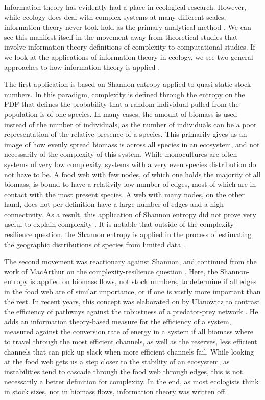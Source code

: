 \documentclass[../main.tex]{subfiles}
\begin{document}
Information theory has evidently had a place in ecological research.
However, while ecology does deal with complex systems at many different scales, information theory never took hold as the primary analytical method \cite{ulanowicz2001information}. %
We can see this manifest itself in the movement away from theoretical studies that involve information theory definitions of complexity to computational studies.
If we look at the applications of information theory in ecology, we see two general approaches to how information theory is applied \cite{ulanowicz2001information}.

The first application is based on Shannon entropy applied to quasi-static stock numbers.
In this paradigm, complexity is defined through the entropy on the PDF that defines the probability that a random individual pulled from the population is of one species.
In many cases, the amount of biomass is used instead of the number of individuals, as the number of individuals can be a poor representation of the relative presence of a species.
This primarily gives us an image of how evenly spread biomass is across all species in an ecosystem, and not necessarily of the complexity of this system.
While monocultures are often systems of very low complexity, systems with a very even species distribution do not have to be.
A food web with few nodes, of which one holds the majority of all biomass, is bound to have a relativily low number of edges, most of which are in contact with the most present species.
A web with many nodes, on the other hand, does not per definition have a large number of edges and a high connectivity.
As a result, this application of Shannon entropy did not prove very useful to explain complexity \cite{ulanowicz2001information}.
It is notable that outside of the complexity-resilience question, the Shannon entropy is applied in the process of estimating the geographic distributions of species from limited data \cite{phillips2006maximum}. %

The second movement was reactionary against Shannon, and continued from the work of MacArthur on the complexity-resilience question \cite{ulanowicz2009quantifying}.
Here, the Shannon-entropy is applied on biomass flows, not stock numbers, to determine if all edges in the food web are of similar importance, or if one is vastly more important than the rest.
In recent years, this concept was elaborated on by Ulanowicz to contrast the efficiency of pathways against the robustness of a predator-prey network \cite{ulanowicz2009quantifying}.
He adds an information theory-based measure for the efficiency of a system, measured against the conversion rate of energy in a system if all biomass where to travel through the most efficient channels, as well as the reserves, less efficient channels that can pick up slack when more efficient channels fail.
While looking at the food web gets us a step closer to the stability of an ecosystem, as instabilities tend to cascade through the food web through edges, this is not necessarily a better definition for complexity.
In the end, as most ecologists think in stock sizes, not in biomass flows, information theory was written off.
\end{document}
